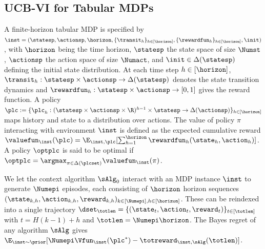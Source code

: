 \documentclass[10pt]{article}
\begin{document}
\subsection{UCB-VI for Tabular MDPs}\label{sec:Tabular-MDP-statement}


A finite-horizon tabular MDP is specified by $\inst=(\statesp,\actionsp, \horizon, \{\transit_h\}_{h\in[\horizon]},\{\rewardfun_h\}_{h\in[\horizon]},\init)$, with $\horizon$ being the time horizon, $\statesp$ the state space of size $\Numst$, $\actionsp$ the action space of size $\Numact$, and $\init\in\Delta(\statesp)$ defining the initial state distribution. At each time step $h\in[\horizon]$, $\transit_h: \statesp\times\actionsp \to \Delta(\statesp)$ denotes the state transition dynamics and $\rewardfun_h:\statesp \times \actionsp \to [0,1]$ gives the reward function. A policy $\plc:=\{\plc_h:(\statesp \times\actionsp \times \R)^{h-1}\times\statesp \to\Delta(\actionsp)\}_{h \in [\horizon]}$ maps history and state to a distribution over actions. The value of policy $\pi$ interacting with environment $\inst$ is defined as the expected cumulative reward $\valuefun_\inst(\plc)=\E_{\inst,\plc}[\sum_{h=1}^\horizon \rewardfun_h (\state_h,\action_h)]$. A policy $\optplc$ is said to be optimal if $\optplc=\argmax_{\pi\in\Delta(\plcset)}\valuefun_\inst(\pi)$. 


We let the context algorithm $\sAlg_0$ interact with an MDP instance $\inst$ to generate $\Numepi$ episodes, each consisting of $\horizon$ horizon sequences $ (\state_{k,h},\action_{k,h},\reward_{k,h})_{k \in [\Numepi], h \in [\horizon]}$. These can be reindexed into a single trajectory $\dset_{\totlen} = \{ (\state_t,\action_t,\reward_t) \}_{t \in [\totlen]}$ with $t=H(k-1)+h$ and $\totlen=\Numepi\horizon$. The Bayes regret of any algorithm $\sAlg$ gives $\E_{\inst\sim\prior}[\Numepi\Vfun_\inst(\plc^*)-\totreward_{\inst,\sAlg}(\totlen)]$. 

\end{document}
